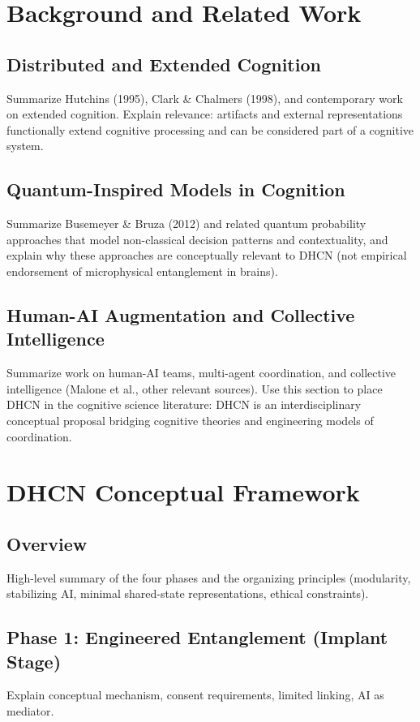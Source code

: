 \documentclass[12pt]{article}
\begin{document}
\section{Background and Related Work}
\subsection{Distributed and Extended Cognition}
Summarize Hutchins (1995), Clark \& Chalmers (1998), and contemporary work on extended cognition. Explain relevance: artifacts and external representations functionally extend cognitive processing and can be considered part of a cognitive system.

\subsection{Quantum-Inspired Models in Cognition}
Summarize Busemeyer \& Bruza (2012) and related quantum probability approaches that model non-classical decision patterns and contextuality, and explain why these approaches are conceptually relevant to DHCN (not empirical endorsement of microphysical entanglement in brains).

\subsection{Human-AI Augmentation and Collective Intelligence}
Summarize work on human-AI teams, multi-agent coordination, and collective intelligence (Malone et al., other relevant sources). Use this section to place DHCN in the cognitive science literature: DHCN is an interdisciplinary conceptual proposal bridging cognitive theories and engineering models of coordination.

\section{DHCN Conceptual Framework}
\subsection{Overview}
High-level summary of the four phases and the organizing principles (modularity, stabilizing AI, minimal shared-state representations, ethical constraints).

\subsection{Phase 1: Engineered Entanglement (Implant Stage)}
Explain conceptual mechanism, consent requirements, limited linking, AI as mediator.
\end{document}
